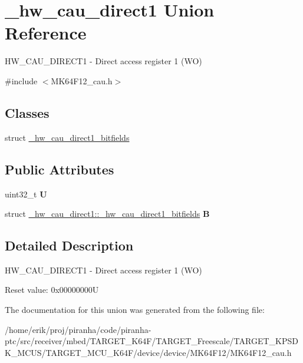 \hypertarget{union__hw__cau__direct1}{}\section{\+\_\+hw\+\_\+cau\+\_\+direct1 Union Reference}
\label{union__hw__cau__direct1}


H\+W\+\_\+\+C\+A\+U\+\_\+\+D\+I\+R\+E\+C\+T1 -\/ Direct access register 1 (WO)  




{\ttfamily \#include $<$M\+K64\+F12\+\_\+cau.\+h$>$}

\subsection*{Classes}
\begin{DoxyCompactItemize}
\item 
struct \hyperlink{struct__hw__cau__direct1_1_1__hw__cau__direct1__bitfields}{\+\_\+hw\+\_\+cau\+\_\+direct1\+\_\+bitfields}
\end{DoxyCompactItemize}
\subsection*{Public Attributes}
\begin{DoxyCompactItemize}
\item 
uint32\+\_\+t {\bfseries U}\hypertarget{union__hw__cau__direct1_a67b53f49211e4c41276745eb2fd8de41}{}\label{union__hw__cau__direct1_a67b53f49211e4c41276745eb2fd8de41}

\item 
struct \hyperlink{struct__hw__cau__direct1_1_1__hw__cau__direct1__bitfields}{\+\_\+hw\+\_\+cau\+\_\+direct1\+::\+\_\+hw\+\_\+cau\+\_\+direct1\+\_\+bitfields} {\bfseries B}\hypertarget{union__hw__cau__direct1_aa2dcd76c79d5d3e0553bef61f96794b2}{}\label{union__hw__cau__direct1_aa2dcd76c79d5d3e0553bef61f96794b2}

\end{DoxyCompactItemize}


\subsection{Detailed Description}
H\+W\+\_\+\+C\+A\+U\+\_\+\+D\+I\+R\+E\+C\+T1 -\/ Direct access register 1 (WO) 

Reset value\+: 0x00000000U 

The documentation for this union was generated from the following file\+:\begin{DoxyCompactItemize}
\item 
/home/erik/proj/piranha/code/piranha-\/ptc/src/receiver/mbed/\+T\+A\+R\+G\+E\+T\+\_\+\+K64\+F/\+T\+A\+R\+G\+E\+T\+\_\+\+Freescale/\+T\+A\+R\+G\+E\+T\+\_\+\+K\+P\+S\+D\+K\+\_\+\+M\+C\+U\+S/\+T\+A\+R\+G\+E\+T\+\_\+\+M\+C\+U\+\_\+\+K64\+F/device/device/\+M\+K64\+F12/M\+K64\+F12\+\_\+cau.\+h\end{DoxyCompactItemize}
